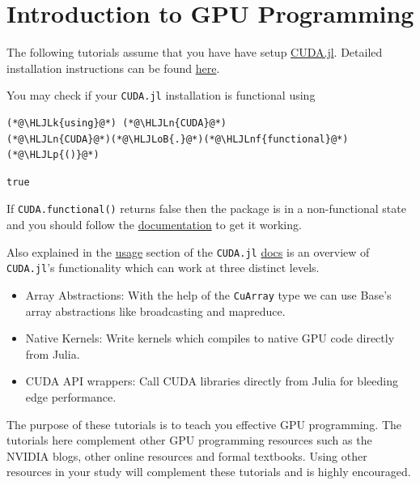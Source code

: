 \documentclass[12pt,a4paper]{article}
\newcommand{\HLJLk}[1]{\textcolor[RGB]{148,91,176}{\textbf{#1}}}
\newcommand{\HLJLn}[1]{#1}
\newcommand{\HLJLnf}[1]{\textcolor[RGB]{66,102,213}{#1}}
\newcommand{\HLJLoB}[1]{\textcolor[RGB]{102,102,102}{\textbf{#1}}}
\newcommand{\HLJLp}[1]{#1}
\begin{document}
\section{Introduction to GPU Programming}
The following tutorials assume that you have have setup \href{https://github.com/JuliaGPU/CUDA.jl}{CUDA.jl}. Detailed installation instructions can be found \href{https://juliagpu.gitlab.io/CUDA.jl/installation/overview/#InstallationOverview}{here}.

You may check if your \texttt{CUDA.jl} installation is functional using 


\begin{lstlisting}
(*@\HLJLk{using}@*) (*@\HLJLn{CUDA}@*)
(*@\HLJLn{CUDA}@*)(*@\HLJLoB{.}@*)(*@\HLJLnf{functional}@*)(*@\HLJLp{()}@*)
\end{lstlisting}

\begin{lstlisting}
true
\end{lstlisting}


If \texttt{CUDA.functional()} returns false then the package is in a non-functional state and you should follow the \href{https://juliagpu.gitlab.io/CUDA.jl/installation/overview/}{documentation} to get it working.

Also explained in the \href{https://juliagpu.gitlab.io/CUDA.jl/usage/overview/}{usage} section of the \texttt{CUDA.jl} \href{https://juliagpu.gitlab.io/CUDA.jl/}{docs} is an overview of \texttt{CUDA.jl}'s functionality which can work at three distinct levels.

\begin{itemize}
\item Array Abstractions: With the help of the \texttt{CuArray} type we can use Base's array abstractions like broadcasting and mapreduce. 


\item Native Kernels: Write kernels which compiles to native GPU code directly from Julia.


\item CUDA API wrappers: Call CUDA libraries directly from Julia for bleeding edge performance.

\end{itemize}
The purpose of these tutorials is to teach you effective GPU programming. The tutorials here complement other GPU programming resources such as the NVIDIA blogs, other online resources and formal textbooks. Using other resources in your study will complement these tutorials and is highly encouraged.
\end{document}
